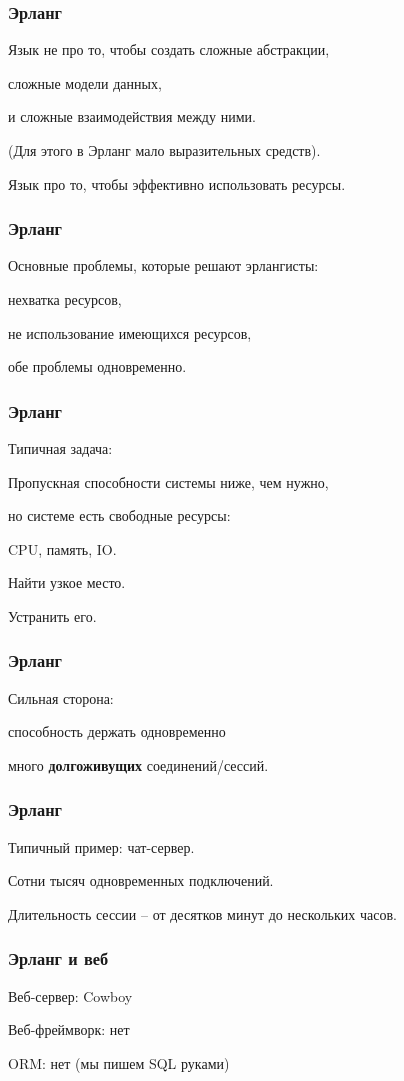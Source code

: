 \documentclass[10pt]{beamer}
\begin{document}
\begin{frame}
\frametitle{Эрланг}
\centering
Язык не про то, чтобы создать сложные абстракции,
\par
сложные модели данных,
\par
и сложные взаимодействия между ними.
\par \bigskip
(Для этого в Эрланг мало выразительных средств).
\par \bigskip
Язык про то, чтобы эффективно использовать ресурсы.
\end{frame}

\begin{frame}
\frametitle{Эрланг}
\centering
Основные проблемы, которые решают эрлангисты:
\par \bigskip
нехватка ресурсов,
\par \bigskip
не использование имеющихся ресурсов,
\par \bigskip
обе проблемы одновременно.
\end{frame}

\begin{frame}
\frametitle{Эрланг}
\centering
Типичная задача:
\par \bigskip
Пропускная способности системы ниже, чем нужно,
\par
но системе есть свободные ресурсы:
\par
CPU, память, IO.
\par \bigskip
Найти узкое место.
\par \bigskip
Устранить его.
\end{frame}

\begin{frame}
\frametitle{Эрланг}
\centering
Сильная сторона:
\par \bigskip
способность держать одновременно
\par
много \textbf{долгоживущих} соединений/сессий.
\end{frame}

\begin{frame}
\frametitle{Эрланг}
\centering
Типичный пример: чат-сервер.
\par \bigskip
Сотни тысяч одновременных подключений.
\par \bigskip
Длительность сессии -- от десятков минут до нескольких часов.
\end{frame}

\begin{frame}
\frametitle{Эрланг и веб}
\centering
Веб-сервер: Cowboy
\par \bigskip
Веб-фреймворк: нет
\par \bigskip
ORM: нет (мы пишем SQL руками)
\end{frame}
\end{document}
